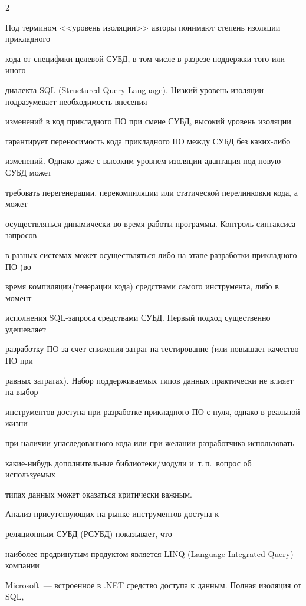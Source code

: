 \begin{multicols}{2}



Под термином <<уровень изоляции>> авторы понимают степень изоляции прикладного 

кода от специфики целевой СУБД, в том числе в разрезе поддержки того или иного 

диалекта SQL (Structured Query Language). Низкий уровень изоляции подразумевает необходимость внесения 

изменений в код прикладного ПО при смене СУБД, высокий уровень изоляции 

гарантирует переносимость кода прикладного ПО между СУБД без каких-либо 

изменений. Однако даже с высоким уровнем изоляции адаптация под новую СУБД может 

требовать перегенерации, перекомпиляции или статической перелинковки кода, а может 

осуществляться динамически во время работы программы. Контроль синтаксиса запросов 

в разных системах может осуществляться либо на этапе разработки прикладного ПО (во 

время компиляции/генерации кода) средствами самого инструмента, либо в момент 

исполнения SQL-за\-про\-са средствами СУБД. Первый подход существенно удешевляет 

разработку ПО за счет снижения затрат на тестирование (или повышает качество ПО при 

равных затратах). Набор поддерживаемых типов данных практически не влияет на выбор 

инструментов доступа при разработке прикладного ПО с нуля, однако в реальной жизни 

при наличии унаследованного кода или при желании разработчика использовать 

ка\-кие-ни\-будь дополнительные биб\-лио\-те\-ки/мо\-ду\-ли и~т.\,п.\ вопрос об используемых 

типах данных может оказаться критически важным. 



Анализ присутствующих на рынке инструментов доступа к 

реляционным СУБД (РСУБД) показывает, что 

наиболее продвинутым продуктом является LINQ (Language Integrated Query) компании 

Microsoft~--- встроенное в .NET средство доступа к данным. Полная изоляция от SQL, 


\end{multicols}
